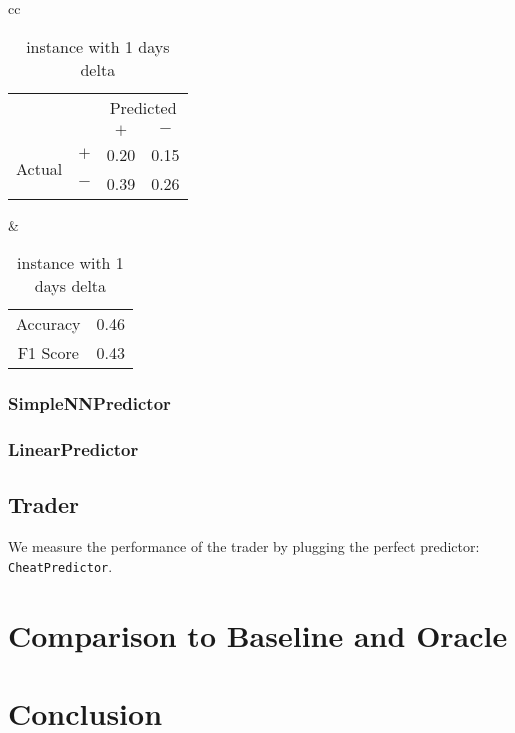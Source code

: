 \documentclass[twocolumn,10pt]{asme2ej}
\begin{document}
\begin{table}
  \begin{tabular}{cc}
    \begin{tabular}{cc|cc}
      & & \multicolumn{2}{c}{Predicted} \\
      & & $+ $ & $-$ \\
      \hline
      \multirow{2}{*}{Actual}
      & $+$ & 0.20 & 0.15 \\
      & $-$ & 0.39 & 0.26 \\
      \hline
    \end{tabular}
    &
    \begin{tabular}{cc}
      Accuracy & 0.46 \\
      F1 Score & 0.43 \\
    \end{tabular}
  \end{tabular}
  \caption{instance with 1 days delta}
\end{table}


\subsubsection{SimpleNNPredictor}


\subsubsection{LinearPredictor}

\subsection{Trader}

We measure the performance of the trader by plugging the perfect
predictor: \verb|CheatPredictor|. 

\section{Comparison to Baseline and Oracle}

\section{Conclusion}




\end{document}
